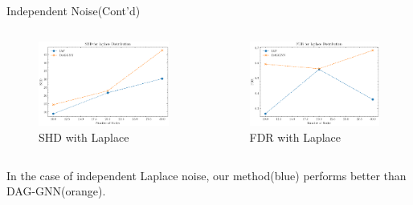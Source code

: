 \documentclass{beamer}
\begin{document}
\begin{frame}{Independent Noise(Cont'd)}
    \begin{columns}
        \begin{column}{0.5\textwidth}
            \begin{figure}
                \centering
                \includegraphics[width=\textwidth]{fig/SHD_independence_laplace.pdf}
                \caption{SHD with Laplace}
                \label{fig:ind_laplace_shd}
            \end{figure}
        \end{column}
        \begin{column}{0.5\textwidth}
            \begin{figure}
                \centering
                \includegraphics[width=\textwidth]{fig/FDR_independence_laplace.pdf}
                \caption{FDR with Laplace}
                \label{fig:ind_laplace_fdr}
            \end{figure}
        \end{column}
    \end{columns}
    In the case of independent Laplace noise, our method(blue) performs better than DAG-GNN(orange).
\end{frame}
\end{document}
